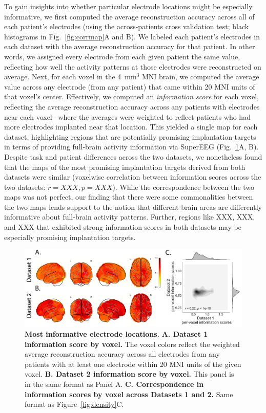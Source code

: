 \documentclass[11pt]{article}
\begin{document}
To gain insights into whether particular electrode locations might be
especially informative, we first computed the average reconstruction
accuracy across all of each patient's electrodes (using the
across-patients cross validation test; black histograms in
Fig.~\ref{fig:corrmap}A and B).  We labeled each patient's electrodes
in each dataset with the average reconstruction accuracy for that
patient.  In other words, we assigned every electrode from each given
patient the same value, reflecting how well the activity patterns at
those electrodes were reconstructed on average.  Next, for each voxel
in the 4~mm$^3$ MNI brain, we computed the average value across any
electrode (from any patient) that came within 20 MNI units of that
voxel's center.  Effectively, we computed an \textit{information
  score} for each voxel, reflecting the average reconstruction
accuracy across any patients with electrodes near each voxel-- where
the averages were weighted to reflect patients who had more electrodes
implanted near that location. This yielded a single map for each
dataset, highlighting regions that are potentially promising
implantation targets in terms of providing full-brain activity
information via SuperEEG (Fig.~\ref{fig:informap}A, B).  Despite task
and patient differences across the two datasets, we nonetheless found
that the maps of the most promising implantation targets derived from
both datasets were similar (voxelwise correlation between information
scores across the two datasets: $r = XXX, p = XXX$).  While the
correspondence between the two maps was not perfect, our finding that
there were some commonalities between the two maps lends support to
the notion that different brain areas are differently informative
about full-brain activity patterns.  Further, regions like XXX, XXX,
and XXX that exhibited strong information scores in both datasets may
be especially promising implantation targets.

\begin{figure}
  \centering
  \includegraphics[width=\textwidth]{figs/informap}
  \caption{\textbf{Most informative electrode locations.}
    \textbf{A. Dataset 1 information score by voxel.} The voxel colors
    reflect the weighted average reconstruction accuracy across all
    electrodes from any patients with at least one electrode within 20
    MNI units of the given voxel.  \textbf{B. Dataset 2 information score by
      voxel.}  This panel is in the same format as Panel A.
    \textbf{C. Correspondence in information scores by voxel across
      Datasets 1 and 2.}  Same format as Figure~\ref{fig:density}C.}
  \label{fig:informap}
\end{figure}
\end{document}
